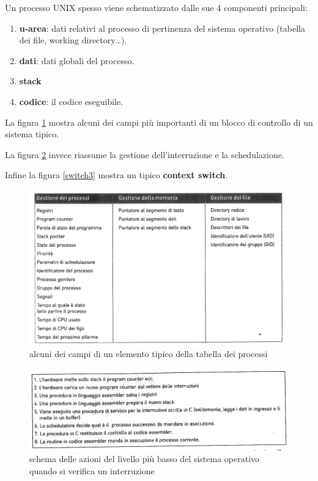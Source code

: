   Un processo UNIX spesso viene schematizzato dalle sue 4 componenti principali:
  \begin{enumerate}
    \item \textbf{u-area}: dati relativi al processo di pertinenza del sistema operativo (tabella dei file, working directory\dots).
    \item \textbf{dati}: dati globali del processo.
    \item \textbf{stack}
    \item \textbf{codice}: il codice eseguibile.
  \end{enumerate}
  
  La figura \ref{tabella3} mostra alcuni dei campi più importanti di un blocco di controllo di un sistema tipico.

  La figura \ref{azioni3} invece riassume la gestione dell'interruzione e la schedulazione.

  Infine la figura \ref{switch3} mostra un tipico \textbf{context switch}.
  
  \begin{figure}[ht]
    \centering
    \includegraphics[width=1\linewidth]{assets/tabella3.png}
    \caption{alcuni dei campi di un elemento tipico della tabella dei processi}
    \label{tabella3}
  \end{figure}
  
  \begin{figure}[!ht]
    \centering
    \includegraphics[width=1\linewidth]{assets/azioni3.png}
    \caption{schema delle azioni del livello più basso del sistema operativo quando si verifica un interruzione}
    \label{azioni3}
  \end{figure}

